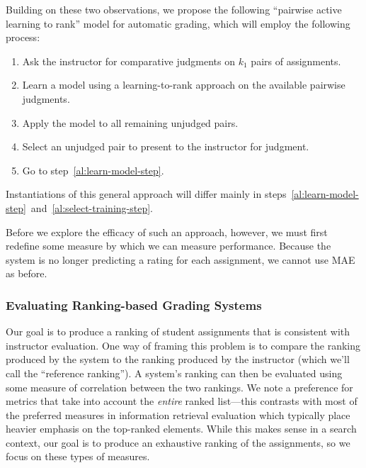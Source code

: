 Building on these two observations, we propose the following ``pairwise
active learning to rank'' model for automatic grading, which will employ
the following process:
\begin{enumerate}
  \item Ask the instructor for comparative judgments on $k_1$ pairs of
    assignments.
  \item Learn a model using a learning-to-rank approach on the available
    pairwise judgments.\label{al:learn-model-step}
  \item Apply the model to all remaining unjudged pairs.
  \item Select an unjudged pair to present to the instructor for judgment.
    \label{al:select-training-step}
  \item Go to step~\ref{al:learn-model-step}.
\end{enumerate}
Instantiations of this general approach will differ mainly in
steps~\ref{al:learn-model-step}~and~\ref{al:select-training-step}.

Before we explore the efficacy of such an approach, however, we must first
redefine some measure by which we can measure performance. Because the
system is no longer predicting a rating for each assignment, we cannot use
MAE as before.

\subsubsection{Evaluating Ranking-based Grading Systems}
Our goal is to produce a ranking of student assignments that is consistent
with instructor evaluation. One way of framing this problem is to compare
the ranking produced by the system to the ranking produced by the
instructor (which we'll call the ``reference ranking''). A system's ranking
can then be evaluated using some measure of correlation between the two
rankings. We note a preference for metrics that take into account the
\emph{entire} ranked list---this contrasts with most of the preferred
measures in information retrieval evaluation which typically place heavier
emphasis on the top-ranked elements. While this makes sense in a search
context, our goal is to produce an exhaustive ranking of the assignments,
so we focus on these types of measures.

